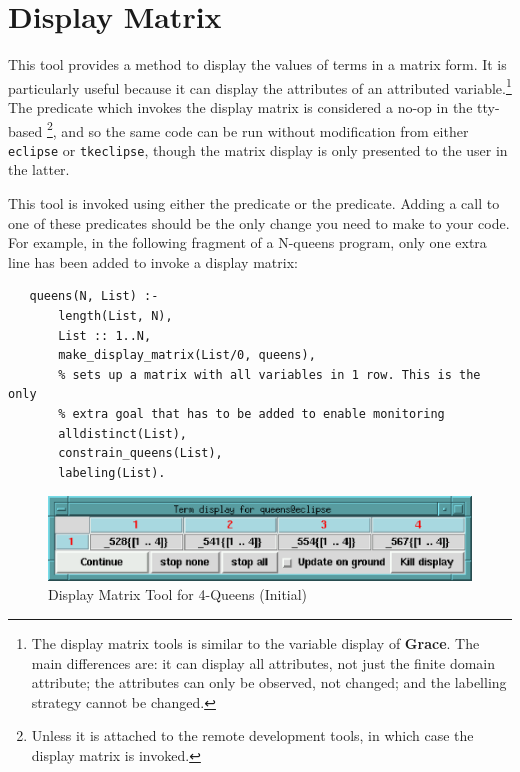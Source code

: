 \section{Display Matrix}
\label{displaymat}

This tool provides a method to display the values of terms in a matrix
form. It is particularly useful because it can display the attributes of an
attributed variable.\footnote{
The display matrix tools is similar to the variable display of {\bf Grace}.
The main differences are:
it can display all attributes, not just the finite domain attribute;
the attributes can only be observed, not changed;
and the labelling strategy cannot be changed.}
The predicate which invokes the display matrix is considered a no-op
in the tty-based {\eclipse}\footnote{Unless it is attached to the remote
development tools, in which case the display matrix is invoked.}, and so the same code can be run without
modification from either \texttt{eclipse} or \texttt{tkeclipse}, though
the matrix display is only presented to the user in the latter.

{\sloppypar
This tool is invoked using either the
predicate or the
predicate.
Adding a call to one of these predicates should be the only change you need
to make to your code.
For example, in the following fragment of a N-queens program, only one
extra line has been added to invoke a display matrix:
}

\begin{verbatim}
   queens(N, List) :-
       length(List, N),
       List :: 1..N,
       make_display_matrix(List/0, queens),
       % sets up a matrix with all variables in 1 row. This is the only
       % extra goal that has to be added to enable monitoring
       alldistinct(List),
       constrain_queens(List),
       labeling(List).
\end{verbatim}

\begin{figure}[bt]
\begin{center}
\includegraphics{dismat.eps}
\end{center}
\caption{Display Matrix Tool for 4-Queens (Initial)}
\label{dismat}
\end{figure}

